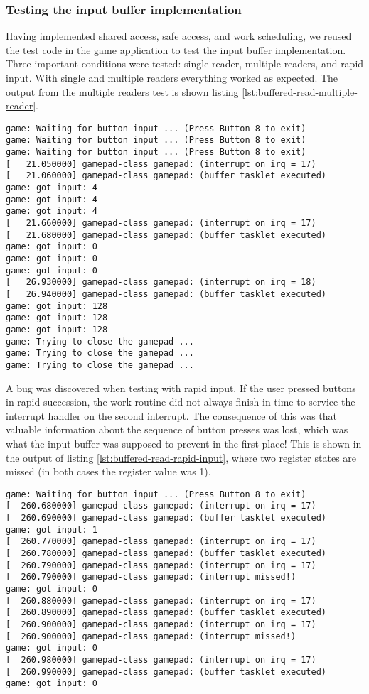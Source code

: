 \subsubsection{Testing the input buffer implementation}
Having implemented shared access, safe access, and work scheduling, we reused the test code in the game application to test the input buffer implementation. Three important conditions were tested: single reader, multiple readers, and rapid input. With single and multiple readers everything worked as expected. The output from the multiple readers test is shown  listing \ref{lst:buffered-read-multiple-reader}.

\begin{lstlisting}[caption=Buffered read with three readers. The program output was sorted.,label=lst:buffered-read-multiple-reader]
game: Waiting for button input ... (Press Button 8 to exit)
game: Waiting for button input ... (Press Button 8 to exit)
game: Waiting for button input ... (Press Button 8 to exit)
[   21.050000] gamepad-class gamepad: (interrupt on irq = 17)
[   21.060000] gamepad-class gamepad: (buffer tasklet executed)
game: got input: 4
game: got input: 4
game: got input: 4
[   21.660000] gamepad-class gamepad: (interrupt on irq = 17)
[   21.680000] gamepad-class gamepad: (buffer tasklet executed)
game: got input: 0
game: got input: 0
game: got input: 0
[   26.930000] gamepad-class gamepad: (interrupt on irq = 18)
[   26.940000] gamepad-class gamepad: (buffer tasklet executed)
game: got input: 128
game: got input: 128
game: got input: 128
game: Trying to close the gamepad ...
game: Trying to close the gamepad ...
game: Trying to close the gamepad ...
\end{lstlisting}
A bug was discovered when testing with rapid input. If the user pressed buttons in rapid succession, the work routine did not always finish in time to service the interrupt handler on the second interrupt. The consequence of this was that valuable information about the sequence of button presses was lost, which was what the input buffer was supposed to prevent in the first place! This is shown in the output of listing \ref{lst:buffered-read-rapid-input}, where two register states are missed (in both cases the register value was 1).
\begin{lstlisting}[caption=Buffered read with rapid input. The program output was sorted.,label=lst:buffered-read-rapid-input]
game: Waiting for button input ... (Press Button 8 to exit)
[  260.680000] gamepad-class gamepad: (interrupt on irq = 17)
[  260.690000] gamepad-class gamepad: (buffer tasklet executed)
game: got input: 1
[  260.770000] gamepad-class gamepad: (interrupt on irq = 17)
[  260.780000] gamepad-class gamepad: (buffer tasklet executed)
[  260.790000] gamepad-class gamepad: (interrupt on irq = 17)
[  260.790000] gamepad-class gamepad: (interrupt missed!)
game: got input: 0
[  260.880000] gamepad-class gamepad: (interrupt on irq = 17)
[  260.890000] gamepad-class gamepad: (buffer tasklet executed)
[  260.900000] gamepad-class gamepad: (interrupt on irq = 17)
[  260.900000] gamepad-class gamepad: (interrupt missed!)
game: got input: 0
[  260.980000] gamepad-class gamepad: (interrupt on irq = 17)
[  260.990000] gamepad-class gamepad: (buffer tasklet executed)
game: got input: 0
\end{lstlisting}

